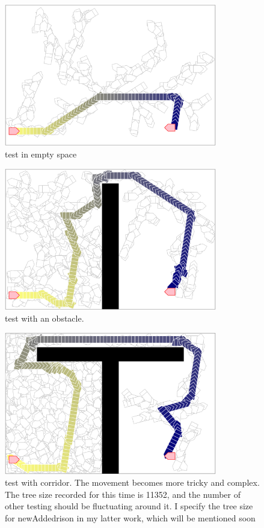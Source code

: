 \documentclass{article}
\begin{document}
\begin{figure}[!h]
\centering
\includegraphics[width=0.827\textwidth]{2-1.png}
\caption{test in empty space}
\label{2-1}
\end{figure}

\begin{figure}[!h]
\centering
\includegraphics[width=0.827\textwidth]{2-2.png}
\caption{test with an obstacle.}
\label{2-2}
\end{figure}

\begin{figure}[!h]
\centering
\includegraphics[width=0.827\textwidth]{2-3.png}
\caption{test with corridor. The movement becomes more tricky and complex. The tree size recorded for this time is 11352, and the number of other testing should be fluctuating around it. I specify the tree size for newAddedrison in my latter work, which will be mentioned soon}
\label{2-3}
\end{figure}
\end{document}
